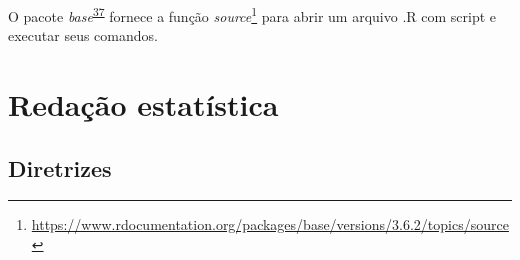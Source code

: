 \documentclass[
  a4paper,
]{book}
\renewcommand{\href}[2]{#2\footnote{\url{#1}}}
\newenvironment{infobox}[1]
  {
  \begin{itemize}
  \renewcommand{\labelitemi}{
    \raisebox{-.7\height}[0pt][0pt]{
      {\setkeys{Gin}{width=3em,keepaspectratio}
        \texttt{[image: \#1]}}
    }
  }
  \setlength{\fboxsep}{1em}
  \begin{blackbox}
  \item
  }
  {
  \end{blackbox}
  \end{itemize}
  }
\begin{document}
\begin{infobox}{images/Rlogo}
O pacote \emph{base}\textsuperscript{\protect\hyperlink{ref-base-2}{37}} fornece a função \href{https://www.rdocumentation.org/packages/base/versions/3.6.2/topics/source}{\emph{source}} para abrir um arquivo .R com script e executar seus comandos.

\end{infobox}

\hypertarget{redacao}{%
\chapter{\texorpdfstring{\textbf{Redação estatística}}{Redação estatística}}\label{redacao}}

\hypertarget{diretrizes}{%
\section{Diretrizes}\label{diretrizes}}
\end{document}
